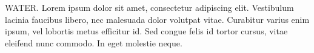 WATER. Lorem ipsum dolor sit amet, consectetur adipiscing elit. Vestibulum lacinia faucibus libero, nec malesuada dolor volutpat vitae. Curabitur varius enim ipsum, vel lobortis metus efficitur id. Sed congue felis id tortor cursus, vitae eleifend nunc commodo. In eget molestie neque.
